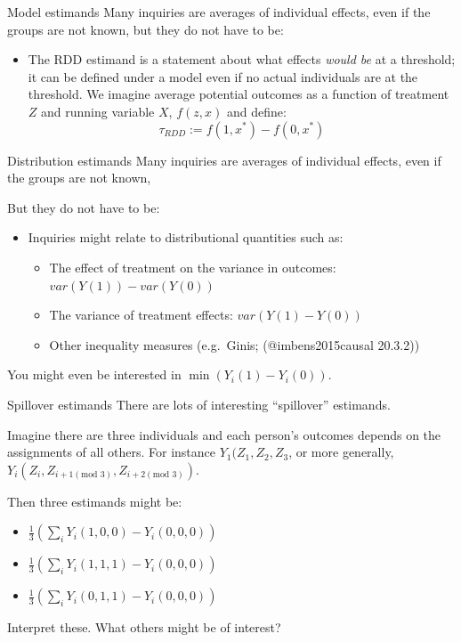 \documentclass[
  11pt,
  ignorenonframetext,
]{beamer}
\providecommand{\tightlist}{%
  \setlength{\itemsep}{0pt}\setlength{\parskip}{0pt}}\usepackage{longtable,booktabs,array}
\begin{document}
\begin{frame}{Model estimands}
\protect\hypertarget{model-estimands}{}
Many inquiries are averages of individual effects, even if the groups
are not known, but they do not have to be:

\begin{itemize}
\tightlist
\item
  The RDD estimand is a statement about what effects \emph{would be} at
  a threshold; it can be defined under a model even if no actual
  individuals are at the threshold. We imagine average potential
  outcomes as a function of treatment \(Z\) and running variable \(X\),
  \(f(z, x)\) and define: \[\tau_{RDD} := f(1, x^*) - f(0, x^*)\]
\end{itemize}
\end{frame}

\begin{frame}{Distribution estimands}
\protect\hypertarget{distribution-estimands}{}
Many inquiries are averages of individual effects, even if the groups
are not known,

But they do not have to be:

\begin{itemize}
\item
  Inquiries might relate to distributional quantities such as:

  \begin{itemize}
  \tightlist
  \item
    The effect of treatment on the variance in outcomes:
    \(var(Y(1)) - var(Y(0))\)
  \item
    The variance of treatment effects: \(var(Y(1) - Y(0))\)
  \item
    Other inequality measures (e.g.~Ginis; (@imbens2015causal 20.3.2))
  \end{itemize}
\end{itemize}

You might even be interested in \(\min(Y_i(1) - Y_i(0))\).
\end{frame}

\begin{frame}{Spillover estimands}
\protect\hypertarget{spillover-estimands}{}
There are lots of interesting ``spillover'' estimands.

Imagine there are three individuals and each person's outcomes depends
on the assignments of all others. For instance \(Y_1(Z_1, Z_2, Z_3\), or
more generally,
\(Y_i(Z_i, Z_{i+1 (\text{mod }3)}, Z_{i+2 (\text{mod }3)})\).

Then three estimands might be:

\begin{itemize}
\tightlist
\item
  \(\frac13\left(\sum_{i}{Y_i(1,0,0) - Y_i(0,0,0)}\right)\)
\item
  \(\frac13\left(\sum_{i}{Y_i(1,1,1) - Y_i(0,0,0)}\right)\)
\item
  \(\frac13\left(\sum_{i}{Y_i(0,1,1) - Y_i(0,0,0)}\right)\)
\end{itemize}

Interpret these. What others might be of interest?
\end{frame}
\end{document}
